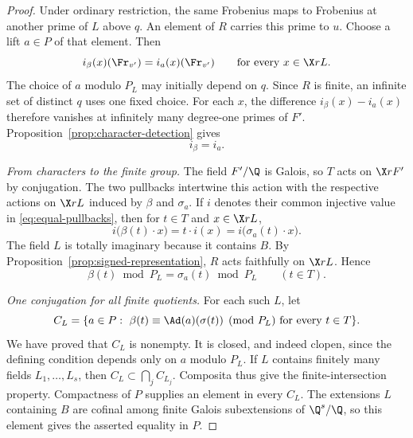 \begin{proof}
Under ordinary restriction, the same Frobenius maps to Frobenius at another prime of $L$ above $q$. An element of $R$ carries this prime to $u$. Choose a lift $a\in P$ of that element. Then
\[
 i_\beta(x)(\Fr_{v'})=i_a(x)(\Fr_{v'})
 \qquad\text{for every }x\in\X rL.
\]
The choice of $a$ modulo $P_L$ may initially depend on $q$. Since $R$ is finite, an infinite set of distinct $q$ uses one fixed choice. For each $x$, the difference $i_\beta(x)-i_a(x)$ therefore vanishes at infinitely many degree-one primes of $F'$. Proposition~\ref{prop:character-detection} gives
\begin{equation}\label{eq:equal-pullbacks}
 i_\beta=i_a.
\end{equation}

\emph{From characters to the finite group.}
The field $F'/\Q$ is Galois, so $T$ acts on $\X r{F'}$ by conjugation. The two pullbacks intertwine this action with the respective actions on $\X rL$ induced by $\beta$ and $\sigma_a$. If $i$ denotes their common injective value in \eqref{eq:equal-pullbacks}, then for $t\in T$ and $x\in\X rL$,
\[
 i\bigl(\beta(t)\cdot x\bigr)
   =t\cdot i(x)
   =i\bigl(\sigma_a(t)\cdot x\bigr).
\]
The field $L$ is totally imaginary because it contains $B$. By Proposition~\ref{prop:signed-representation}, $R$ acts faithfully on $\X rL$. Hence
\[
 \beta(t)\bmod P_L=\sigma_a(t)\bmod P_L\qquad(t\in T).
\]

\emph{One conjugation for all finite quotients.}
For each such $L$, let
\[
 C_L=\{a\in P:\ \beta(t)\equiv\Ad(a)(\sigma(t))\pmod{P_L}
                    \text{ for every }t\in T\}.
\]
We have proved that $C_L$ is nonempty. It is closed, and indeed clopen, since the defining condition depends only on $a$ modulo $P_L$. If $L$ contains finitely many fields $L_1,\ldots,L_s$, then $C_L\subset\bigcap_j C_{L_j}$. Composita thus give the finite-intersection property. Compactness of $P$ supplies an element in every $C_L$. The extensions $L$ containing $B$ are cofinal among finite Galois subextensions of $\Q^s/\Q$, so this element gives the asserted equality in $P$.
\end{proof}

